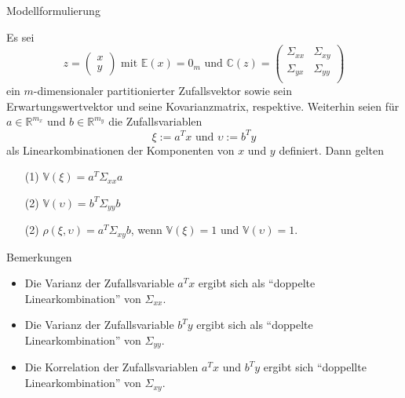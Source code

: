 \documentclass[
  8pt,
  ignorenonframetext,
]{beamer}
\providecommand{\tightlist}{%
  \setlength{\itemsep}{0pt}\setlength{\parskip}{0pt}}
\begin{document}
\begin{frame}{Modellformulierung}
\protect\hypertarget{modellformulierung}{}
\footnotesize
\begin{theorem}
\justifying
\normalfont
Es sei
\begin{equation}
z = \begin{pmatrix} x \\ y \end{pmatrix}
\mbox{ mit }
\mathbb{E}(x) = 0_m
\mbox{ und }
\mathbb{C}(z) =
\begin{pmatrix}
\Sigma_{xx} & \Sigma_{xy} \\
\Sigma_{yx} & \Sigma_{yy} \\
\end{pmatrix}
\end{equation}
ein $m$-dimensionaler partitionierter Zufallsvektor sowie sein
Erwartungswertvektor und seine Kovarianzmatrix, respektive. Weiterhin seien für
$a \in \mathbb{R}^{m_x}$ und $b\in\mathbb{R}^{m_y}$
die Zufallsvariablen
\begin{equation}
\xi := a^T x \mbox{ und } \upsilon := b^T y
\end{equation}
als Linearkombinationen der Komponenten von $x$ und $y$ definiert.
Dann gelten
\begin{itemize}
\item[(1)] $\mathbb{V}(\xi) = a^T\Sigma_{xx}a$
\item[(2)] $\mathbb{V}(\upsilon) = b^T\Sigma_{yy}b$
\item[(2)] $\rho(\xi,\upsilon) = a^T \Sigma_{xy}b$, wenn  $\mathbb{V}(\xi) = 1$ und $\mathbb{V}(\upsilon) = 1$.
\end{itemize}
\end{theorem}

Bemerkungen

\begin{itemize}
\tightlist
\item
  Die Varianz der Zufallsvariable \(a^Tx\) ergibt sich als ``doppelte
  Linearkombination'' von \(\Sigma_{xx}\).
\item
  Die Varianz der Zufallsvariable \(b^Ty\) ergibt sich als ``doppelte
  Linearkombination'' von \(\Sigma_{yy}\).
\item
  Die Korrelation der Zufallsvariablen \(a^Tx\) und \(b^Ty\) ergibt sich
  ``doppellte Linearkombination'' von \(\Sigma_{xy}\).
\end{itemize}
\end{frame}
\end{document}
